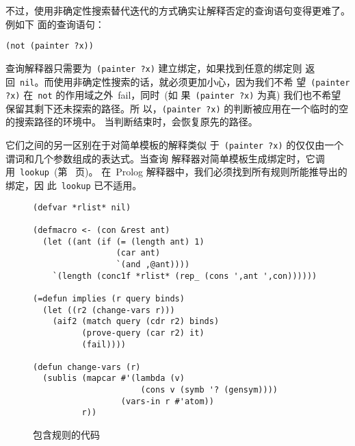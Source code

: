 不过，使用非确定性搜索替代迭代的方式确实让解释否定的查询语句变得更难了。例如下
面的查询语句：
\begin{lstlisting}
(not (painter ?x))
\end{lstlisting}
查询解释器只需要为~\verb|(painter ?x)| 建立绑定，如果找到任意的绑定则
返回~\texttt{nil}。而使用非确定性搜索的话，就必须更加小心，因为我们不希
望~\texttt{(painter ?x)} 在~\verb|not| 的作用域之外~fail，同时~(如
果~\texttt{(painter ?x)} 为真) 我们也不希望保留其剩下还未探索的路径。所
以，\texttt{(painter ?x)} 的判断被应用在一个临时的空的搜索路径的环境中。
当判断结束时，会恢复原先的路径。

它们之间的另一区别在于对简单模板的解释\pozhehao{}类似
于~\texttt{(painter ?x)} 的仅仅由一个谓词和几个参数组成的表达式。当查询
解释器对简单模板生成绑定时，它调
用~\texttt{lookup}~(第~\pageref{fig:query_interpreter} 页)。
在~Prolog 解释器中，我们必须找到所有规则所能推导出的绑定，因
此~\texttt{lookup} 已不适用。

\begin{figure}
\begin{lstlisting}
(defvar *rlist* nil)

(defmacro <- (con &rest ant)
  (let ((ant (if (= (length ant) 1)
                 (car ant)
                 `(and ,@ant))))
    `(length (conc1f *rlist* (rep_ (cons ',ant ',con))))))

(=defun implies (r query binds)
  (let ((r2 (change-vars r)))
    (aif2 (match query (cdr r2) binds)
          (prove-query (car r2) it)
          (fail))))

(defun change-vars (r)
  (sublis (mapcar #'(lambda (v)
                      (cons v (symb '? (gensym))))
                  (vars-in r #'atom))
          r))
\end{lstlisting}
  \caption{包含规则的代码}
  \label{fig:code_involving_rules}
\end{figure}


